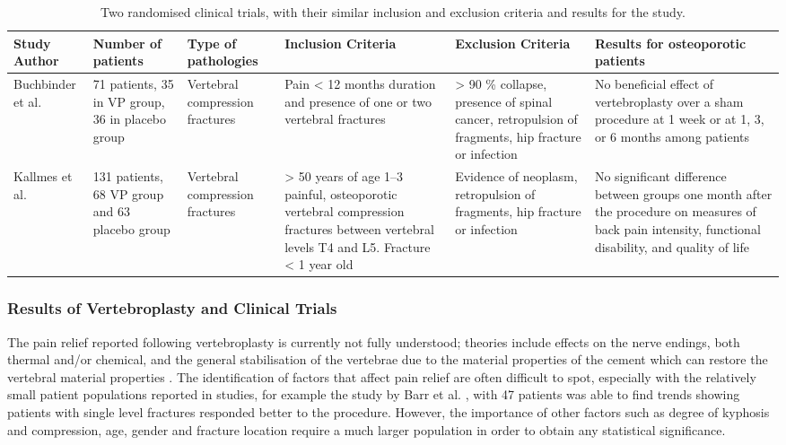 \begin{table}[hbt]
    \caption{Two randomised clinical trials, with their similar inclusion and
exclusion criteria and results for the study.}
    \label{tab:randclinical}
\begin{tabular}{P{2cm}|P{2cm}|P{2cm}|P{2.5cm}|P{2.5cm}|P{2.3cm}}
Study Author & Number of patients & Type of pathologies & Inclusion Criteria & Exclusion Criteria & Results for osteoporotic patients\\ 
\hline
\hline
Buchbinder et al. \cite{Buchbinder2009} & 71 patients, 35 in VP group, 36 in
placebo group & Vertebral
compression fractures & Pain \textless{} 12 months
duration and presence of one or two vertebral fractures & \textgreater{}
90 \% collapse, presence of spinal cancer, retropulsion of fragments,
hip fracture or infection & No beneficial effect of vertebroplasty over
a sham procedure at 1 week or at 1, 3, or 6 months among
patients\\
\hline
Kallmes et al. \cite{Kallmes2009} & 131 patients, 68 VP group and 63 placebo
group
& Vertebral compression fractures & \textgreater{} 50 years of age 1--3
painful, osteoporotic vertebral compression fractures between vertebral
levels T4 and L5. Fracture \textless{} 1 year old & Evidence of
neoplasm, retropulsion of fragments, hip fracture or infection & No
significant difference between groups one month after the procedure on
measures of back pain intensity, functional disability, and quality of
life\tabularnewline

\end{tabular}
\end{table}

\subsubsection{Results of Vertebroplasty and Clinical
Trials}\label{results-of-vertebroplasty-and-clinical-trials}

The pain relief reported following vertebroplasty is currently not fully
understood; theories include effects on the nerve endings, both thermal
and/or chemical, and the general stabilisation of the vertebrae due to
the material properties of the cement which can restore the vertebral material properties
\cite{belkoff2001biomechanics}. The identification of factors that affect
pain relief are
often difficult to spot, especially with the relatively small patient
populations reported in studies, for example the study by Barr et al.
\cite{belkoff2002ex}, with 47 patients was able to find trends showing
patients with
single level fractures responded better to the procedure. However, the
importance of other factors such as degree of kyphosis and compression,
age, gender and fracture location require a much larger population in
order to obtain any statistical significance.

